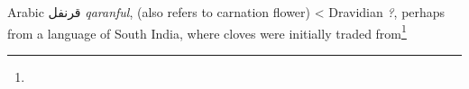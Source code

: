 \begin{etymology}\label{ety:qaranful}
Arabic {قرنفل} \textit{qaranful}, (also refers to carnation flower)
< Dravidian \textit{?}, perhaps from a language of South India, where cloves were initially traded from\footnote{}
\end{etymology}